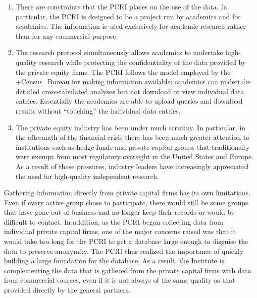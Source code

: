 \documentclass[
]{book}
\begin{document}
\begin{enumerate}
\def\labelenumi{\arabic{enumi})}
\item
  There are constraints that the PCRI places on the use of the data. In particular, the PCRI is designed to be a project run by academics and for academics. The information is used exclusively for academic research rather than for any commercial purpose.
\item
  The research protocol simultaneously allows academics to undertake high-quality research while protecting the confidentiality of the data provided by the private equity firms. The PCRI follows the model employed by the +Census\_Bureau\textbar{} for making information available: academics can undertake detailed cross-tabulated analyses but not download or view individual data entries. Essentially the academics are able to upload queries and download results without ``touching'' the individual data entries.
\item
  The private equity industry has been under much scrutiny. In particular, in the aftermath of the financial crisis there has been much greater attention to institutions such as hedge funds and private capital groups that traditionally were exempt from most regulatory oversight in the United States and Europe. As a result of these pressures, industry leaders have increasingly appreciated the need for high-quality independent research.
\end{enumerate}

Gathering information directly from private capital firms has its own limitations. Even if every active group chose to participate, there would still be some groups that have gone out of business and no longer keep their records or would be difficult to contact. In addition, as the PCRI began collecting data from individual private capital firms, one of the major concerns raised was that it would take too long for the PCRI to get a database large enough to disguise the data to preserve anonymity. The PCRI thus realized the importance of quickly building a large foundation for the database. As a result, the Institute is complementing the data that is gathered from the private capital firms with data from commercial sources, even if it is not always of the same quality as that provided directly by the general partners.
\end{document}
